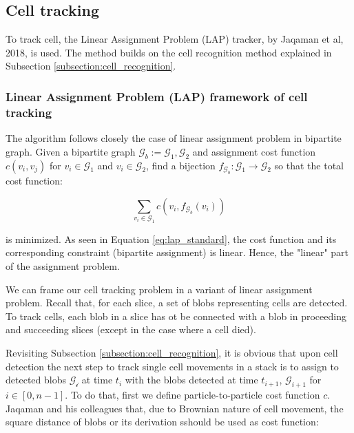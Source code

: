 \documentclass[pdftex,12pt,a4paper]{report}
\begin{document}
\subsection{Cell tracking}
\label{subsection:cell_tracking}

To track cell, the Linear Assignment Problem (LAP) tracker, by Jaqaman et al, 2018, is used. The method builds on the cell recognition method explained in Subsection \ref{subsection:cell_recognition}.

\subsubsection*{Linear Assignment Problem (LAP) framework of cell tracking}

The algorithm follows closely the case of linear assignment problem in bipartite graph. Given a bipartite graph $\mathcal{G}_b:= {\mathcal{G}_1, \mathcal{G}_2}$ and assignment cost function 
$c(v_i, v_j)$ for $v_i \in \mathcal{G}_1$ and $v_i \in \mathcal{G}_2$, find a bijection $f_{\mathcal{G}_b} : \mathcal{G}_1 \rightarrow \mathcal{G}_2$ so that the total cost function:

\begin{equation}
\sum_{v_i \in \mathcal{G}_1} c(v_i, f_{\mathcal{G}_b}(v_i))
\label{eq:lap_standard}
\end{equation}


is minimized. As seen in Equation \ref{eq:lap_standard}, the cost function and its corresponding constraint (bipartite assignment) is linear. Hence, the "linear" part of the assignment problem.

We can frame our cell tracking problem in a variant of linear assignment problem. Recall that, for each slice, a set of blobs representing cells are detected. To track cells, each blob in a slice has ot be connected with a blob in proceeding and succeeding slices (except in the case where a cell died).

Revisiting Subsection \ref{subsection:cell_recognition}, it is obvious that upon cell  detection the next step to track single cell movements in a stack is to assign to detected blobs $\mathcal{G_i}$ at time $t_i$ with the blobs detected at time $t_{i + 1}$, $\mathcal{G}_{i + 1}$ for $i \in [0, n - 1]$. To do that, first we define particle-to-particle cost function $c$. Jaqaman and his colleagues \cite{jaqaman2008robust} that, due to Brownian nature of cell movement, the square distance of blobs or its derivation sshould be used as cost function: 
\end{document}
